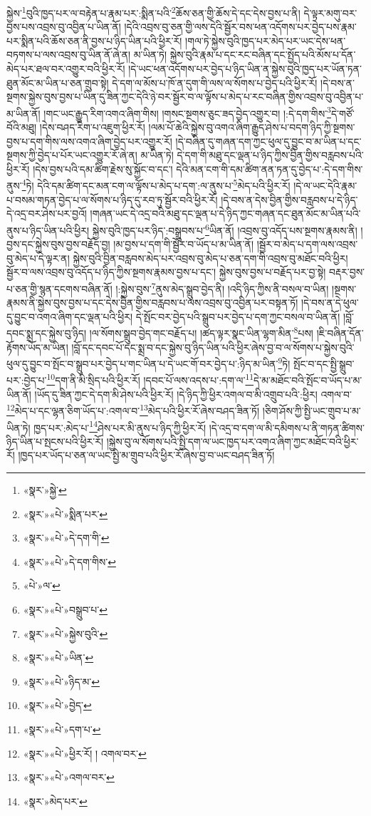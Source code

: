 སྐྱེས་\footnote{«སྣར་»སྐྱེ་}བུའི་ཁྱད་པར་ལ་བརྟེན་པ་རྣམ་པར་:སྨིན་པའི་\footnote{«སྣར་»«པེ་»སྨིན་པར་}ཆོས་ཅན་གྱི་ཆོས་དེ་དང་དེས་བྱས་པ་ནི། དེ་ལྟར་མགུ་བར་བྱས་པས་འབྲས་བུ་འབྱིན་པ་ཡིན་ནོ། །དེའི་འབྲས་བུ་ཅན་གྱི་ལས་དེའི་སྦྱོར་བས་ཕན་འདོགས་པར་བྱེད་པས་རྣམ་པར་སྨིན་པའི་ཆོས་ཅན་ནི་བྱས་པ་ཉིད་ཡིན་པའི་ཕྱིར་རོ། །གལ་ཏེ་སྐྱེས་བུའི་ཁྱད་པར་མེད་པར་ཡང་དེས་ཕན་བཏགས་པ་ལས་འབྲས་བུ་ཡིན་ནོ་ཞེ་ན། མ་ཡིན་ཏེ། སྐྱེས་བུའི་རྣམ་པ་དང་རང་བཞིན་དང་སྤྱོད་པའི་མོས་པ་དོན་མེད་པར་ཐལ་བར་འགྱུར་བའི་ཕྱིར་རོ། །དེ་ཡང་ཕན་འདོགས་པར་བྱེད་པ་ཉིད་ཡིན་ན་སྐྱེས་བུའི་ཁྱད་པར་ཡོན་ཏན་ཐུན་མོང་མ་ཡིན་པ་ཅན་གྲུབ་སྟེ། དེ་དག་ལ་མོས་པ་ཁོ་ན་དུག་གི་ལས་ལ་སོགས་པ་བྱེད་པའི་ཕྱིར་རོ། །དེ་བས་ན་སྔགས་སྐྱེས་བུས་བྱས་པ་ཡིན་དུ་ཟིན་ཀྱང་དེའི་ཉེ་བར་སྦྱོར་བ་ལ་ལྟོས་པ་མེད་པ་རང་བཞིན་གྱིས་འབྲས་བུ་འབྱིན་པ་མ་ཡིན་ནོ། །གང་ཡང་རྒྱུད་རིག་འགའ་ཞིག་གིས། །གསང་སྔགས་ཅུང་ཟད་བྱེད་འགྱུར་བ། །:དེ་དག་གིས་\footnote{«སྣར་»«པེ་»དེ་དག་གི་}དེ་གཙོ་བོའི་མཐུ། །དེས་བཤད་རིག་པ་འཇུག་ཕྱིར་རོ། །ལམ་པོ་ཆེའི་སྐྱེས་བུ་འགའ་ཞིག་རྒྱུད་ཤེས་པ་བདག་ཉིད་ཀྱི་སྔགས་བྱས་པ་དག་གིས་ལས་འགའ་ཞིག་བྱེད་པར་འགྱུར་རོ། །དེ་བཞིན་དུ་གཞན་དག་ཀྱང་ཕུལ་དུ་བྱུང་བ་མ་ཡིན་པ་དང་སྔགས་ཀྱི་བྱེད་པ་པོར་ཡང་འགྱུར་རོ་ཞེ་ན། མ་ཡིན་ཏེ། དེ་དག་གི་མཐུ་དང་ལྡན་པ་ཉིད་ཀྱིས་བྱིན་གྱིས་བརླབས་པའི་ཕྱིར་རོ། །དེས་བྱས་པའི་དམ་ཚིག་རྗེས་སུ་སྐྱོང་བ་དང་། དེའི་མན་ངག་གི་དམ་ཚིག་ནན་ཏན་དུ་བྱེད་པ་:དེ་དག་གིས་ནུས་\footnote{«སྣར་»«པེ་»དེ་དག་གིས་}ཏེ། དེའི་དམ་ཚིག་དང་མན་ངག་ལ་ལྟོས་པ་མེད་པ་དག་:ལ་ནུས་པ་\footnote{«པེ་»ལ་}མེད་པའི་ཕྱིར་རོ། །དེ་ལ་ཡང་དེའི་རྣམ་པ་བསམ་གཏན་བྱེད་པ་ལ་སོགས་པ་ཉིད་དུ་རབ་ཏུ་སྦྱོར་བའི་ཕྱིར་རོ། །དེ་བས་ན་དེས་བྱིན་གྱིས་བརླབས་པ་དེ་ཉིད་དེ་འདྲ་བར་ཤེས་པར་བྱའོ། །གཞན་ཡང་དེ་འདྲ་བའི་མཐུ་དང་ལྡན་པ་དེ་ཉིད་ཀྱང་གཞན་དང་ཐུན་མོང་མ་ཡིན་པའི་ནུས་པ་ཉིད་ཡིན་པའི་ཕྱིར། སྐྱེས་བུའི་ཁྱད་པར་ཉིད་:བསྒྲུབས་པ་\footnote{«སྣར་»«པེ་»བསྒྲུབ་པ་}ཡིན་ནོ། །འབྲས་བུ་འདོད་པས་སྔགས་རྣམས་ནི། །བྱས་དང་སྐྱེས་བུས་བྱས་བརྗོད་བྱ། །མ་བྱས་པ་དག་གི་སྦྱོར་བ་ཡོད་པ་མ་ཡིན་ནོ། །སྦྱོར་བ་མེད་པ་དག་ལས་འབྲས་བུ་མེད་པ་དེ་ལྟར་ན། སྐྱེས་བུའི་བྱིན་བརླབས་མེད་པར་འབྲས་བུ་མེད་པ་ཅན་དག་གི་འབྲས་བུ་མཐོང་བའི་ཕྱིར། སྦྱོར་བ་ལས་འབྲས་བུ་འདོད་པ་ཉིད་ཀྱིས་སྔགས་རྣམས་བྱས་པ་དང་། སྐྱེས་བུས་བྱས་པ་བརྗོད་པར་བྱ་སྟེ། བརྡར་བྱས་པ་ཅན་གྱི་སྙན་དངགས་བཞིན་ནོ། །:སྐྱེས་བུས་\footnote{«སྣར་»«པེ་»སྐྱེས་བུའི་}ནུས་མེད་སྒྲུབ་བྱེད་ནི། །འདི་ཉིད་ཀྱིས་ནི་བསལ་བ་ཡིན། །སྔགས་རྣམས་ནི་སྐྱེས་བུས་བྱས་པ་དང་དེས་བྱིན་གྱིས་བརླབས་པ་ལས་འབྲས་བུ་འབྱིན་པར་བསྟན་ཏོ། །དེ་བས་ན་དེ་ཕུལ་དུ་བྱུང་བ་འགའ་ཞིག་དང་ལྡན་པའི་ཕྱིར། དེ་སྤོང་བར་བྱེད་པའི་སྒྲུབ་པར་བྱེད་པ་དག་ཀྱང་བསལ་བ་ཡིན་ནོ། །བློ་དབང་སྨྲ་དང་སྐྱེས་བུ་ཉིད། །ལ་སོགས་སྒྲུབ་བྱེད་གང་བརྗོད་པ། །ཚད་ལྟར་སྣང་ཡིན་ལྷག་མིན་\footnote{«སྣར་»«པེ་»ཡིན་}པས། །ཇི་བཞིན་དོན་རྟོགས་ཡོད་མ་ཡིན། །བློ་དང་དབང་པོ་དང་སྨྲ་བ་དང་སྐྱེས་བུ་ཉིད་ཡིན་པའི་ཕྱིར་ཞེས་བྱ་བ་ལ་སོགས་པ་སྐྱེས་བུའི་ཕུལ་དུ་བྱུང་བ་སྤོང་བ་སྒྲུབ་པར་བྱེད་པ་གང་ཡིན་པ་དེ་ཡང་གོ་བར་བྱེད་པ་:ཉིད་མ་ཡིན་\footnote{«སྣར་»«པེ་»ཉིད་མ་}ཏེ། སྤོང་བ་དང་སྤྱི་སྒྲུབ་པར་:བྱེད་པ་\footnote{«སྣར་»«པེ་»བྱེད་}དག་ནི་མི་སྲིད་པའི་ཕྱིར་རོ། །དབང་པོ་ལས་འདས་པ་:དག་ལ་\footnote{«སྣར་»«པེ་»དག་པ་}དེ་མ་མཐོང་བའི་སྤོང་བ་ཡོད་པ་མ་ཡིན་ནོ། །ཡོད་དུ་ཟིན་ཀྱང་དེ་དག་མི་ཤེས་པའི་ཕྱིར་རོ། །དེ་ཉིད་ཀྱི་ཕྱིར་འགལ་བ་མི་འགྲུབ་པའི་:ཕྱིར། འགལ་བ་\footnote{«སྣར་»«པེ་»ཕྱིར་རོ། ། འགལ་བར་}མེད་པ་དང་ལྷན་ཅིག་ཡོད་པ་:འགལ་བ་\footnote{«སྣར་»«པེ་»འགལ་བར་}མེད་པའི་ཕྱིར་རོ་ཞེས་བཤད་ཟིན་ཏོ། །ཅིག་ཤོས་ཀྱི་སྤྱི་ཡང་གྲུབ་པ་མ་ཡིན་ཏེ། ཁྱད་པར་:མེད་པ་\footnote{«སྣར་»མེད་པར་}ཤེས་པར་མི་ནུས་པ་ཉིད་ཀྱི་ཕྱིར་རོ། །དེ་འདྲ་བ་དག་ལ་མི་དམིགས་པ་ནི་གཏན་ཚིགས་ཉིད་ཡིན་པ་སྤངས་པའི་ཕྱིར་རོ། །སྐྱེས་བུ་ལ་སོགས་པའི་སྤྱི་དག་ལ་ཡང་ཁྱད་པར་འགའ་ཞིག་ཀྱང་མཐོང་བའི་ཕྱིར་རོ། །ཁྱད་པར་ཡོད་པ་ཅན་ལ་ཡང་སྤྱི་མ་གྲུབ་པའི་ཕྱིར་རོ་ཞེས་བྱ་བ་ཡང་བཤད་ཟིན་ཏོ། 